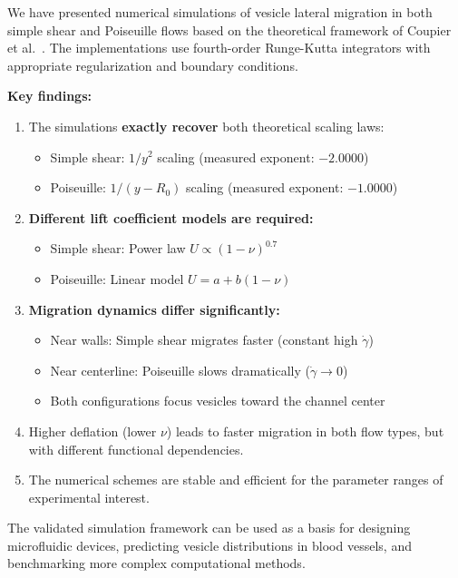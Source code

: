 \documentclass{article}
\begin{document}
We have presented numerical simulations of vesicle lateral migration in both simple shear and Poiseuille flows based on the theoretical framework of Coupier et al.~\cite{coupier2009}. The implementations use fourth-order Runge-Kutta integrators with appropriate regularization and boundary conditions.

\textbf{Key findings:}
\begin{enumerate}
    \item The simulations \textbf{exactly recover} both theoretical scaling laws:
    \begin{itemize}
        \item Simple shear: $1/y^2$ scaling (measured exponent: $-2.0000$)
        \item Poiseuille: $1/(y-R_0)$ scaling (measured exponent: $-1.0000$)
    \end{itemize}
    
    \item \textbf{Different lift coefficient models are required:}
    \begin{itemize}
        \item Simple shear: Power law $U \propto (1-\nu)^{0.7}$
        \item Poiseuille: Linear model $U = a + b(1-\nu)$
    \end{itemize}
    
    \item \textbf{Migration dynamics differ significantly:}
    \begin{itemize}
        \item Near walls: Simple shear migrates faster (constant high $\dot{\gamma}$)
        \item Near centerline: Poiseuille slows dramatically ($\dot{\gamma} \to 0$)
        \item Both configurations focus vesicles toward the channel center
    \end{itemize}
    
    \item Higher deflation (lower $\nu$) leads to faster migration in both flow types, but with different functional dependencies.
    
    \item The numerical schemes are stable and efficient for the parameter ranges of experimental interest.
\end{enumerate}

The validated simulation framework can be used as a basis for designing microfluidic devices, predicting vesicle distributions in blood vessels, and benchmarking more complex computational methods.

\printbibliography 
\end{document}
